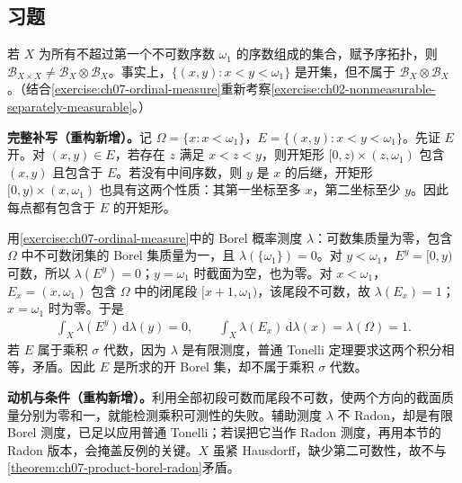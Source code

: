 \documentclass[../../main.tex]{subfiles}
\begin{document}
\subsection*{习题}
\begin{exercise}\label{exercise:ch07-ordinal-product-borel}
若 $X$ 为所有不超过第一个不可数序数 $\omega_1$ 的序数组成的集合，赋予序拓扑，则 $\mathscr B_{X\times X}\ne\mathscr B_X\otimes\mathscr B_X$。事实上，$\{(x,y):x<y<\omega_1\}$ 是开集，但不属于 $\mathscr B_X\otimes\mathscr B_X$。（结合\cref{exercise:ch07-ordinal-measure}重新考察\cref{exercise:ch02-nonmeasurable-separately-measurable}。）
\end{exercise}
\begin{solution}
\textbf{完整补写（重构新增）。}记 $\Omega=\{x:x<\omega_1\}$，$E=\{(x,y):x<y<\omega_1\}$。先证 $E$ 开。对 $(x,y)\in E$，若存在 $z$ 满足 $x<z<y$，则开矩形 $[0,z)\times(z,\omega_1)$ 包含 $(x,y)$ 且包含于 $E$。若没有中间序数，则 $y$ 是 $x$ 的后继，开矩形 $[0,y)\times(x,\omega_1)$ 也具有这两个性质：其第一坐标至多 $x$，第二坐标至少 $y$。因此每点都有包含于 $E$ 的开矩形。

用\cref{exercise:ch07-ordinal-measure}中的 Borel 概率测度 $\lambda$：可数集质量为零，包含 $\Omega$ 中不可数闭集的 Borel 集质量为一，且 $\lambda(\{\omega_1\})=0$。对 $y<\omega_1$，$E^y=[0,y)$ 可数，所以 $\lambda(E^y)=0$；$y=\omega_1$ 时截面为空，也为零。对 $x<\omega_1$，$E_x=(x,\omega_1)$ 包含 $\Omega$ 中的闭尾段 $[x+1,\omega_1)$，该尾段不可数，故 $\lambda(E_x)=1$；$x=\omega_1$ 时为零。于是
\begin{align*}
\int_X\lambda(E^y)\,\mathrm d\lambda(y)=0,\qquad
\int_X\lambda(E_x)\,\mathrm d\lambda(x)=\lambda(\Omega)=1.
\end{align*}
若 $E$ 属于乘积 $\sigma$ 代数，因为 $\lambda$ 是有限测度，普通 Tonelli 定理要求这两个积分相等，矛盾。因此 $E$ 是所求的开 Borel 集，却不属于乘积 $\sigma$ 代数。
\end{solution}
\begin{remark}
\textbf{动机与条件（重构新增）。}利用全部初段可数而尾段不可数，使两个方向的截面质量分别为零和一，就能检测乘积可测性的失败。辅助测度 $\lambda$ 不 Radon，却是有限 Borel 测度，已足以应用普通 Tonelli；若误把它当作 Radon 测度，再用本节的 Radon 版本，会掩盖反例的关键。$X$ 虽紧 Hausdorff，缺少第二可数性，故不与\cref{theorem:ch07-product-borel-radon}矛盾。
\end{remark}
\end{document}
